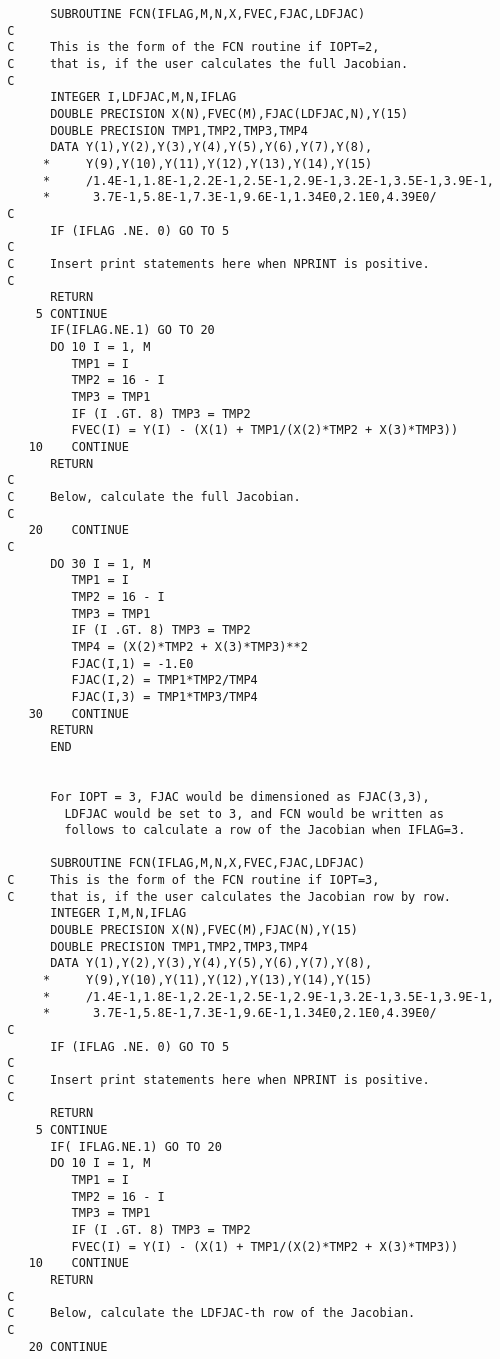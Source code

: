 \begin{verbatim}
       SUBROUTINE FCN(IFLAG,M,N,X,FVEC,FJAC,LDFJAC)
 C
 C     This is the form of the FCN routine if IOPT=2,
 C     that is, if the user calculates the full Jacobian.
 C
       INTEGER I,LDFJAC,M,N,IFLAG
       DOUBLE PRECISION X(N),FVEC(M),FJAC(LDFJAC,N),Y(15)
       DOUBLE PRECISION TMP1,TMP2,TMP3,TMP4
       DATA Y(1),Y(2),Y(3),Y(4),Y(5),Y(6),Y(7),Y(8),
      *     Y(9),Y(10),Y(11),Y(12),Y(13),Y(14),Y(15)
      *     /1.4E-1,1.8E-1,2.2E-1,2.5E-1,2.9E-1,3.2E-1,3.5E-1,3.9E-1,
      *      3.7E-1,5.8E-1,7.3E-1,9.6E-1,1.34E0,2.1E0,4.39E0/
 C
       IF (IFLAG .NE. 0) GO TO 5
 C
 C     Insert print statements here when NPRINT is positive.
 C
       RETURN
     5 CONTINUE
       IF(IFLAG.NE.1) GO TO 20
       DO 10 I = 1, M
          TMP1 = I
          TMP2 = 16 - I
          TMP3 = TMP1
          IF (I .GT. 8) TMP3 = TMP2
          FVEC(I) = Y(I) - (X(1) + TMP1/(X(2)*TMP2 + X(3)*TMP3))
    10    CONTINUE
       RETURN
 C
 C     Below, calculate the full Jacobian.
 C
    20    CONTINUE
 C
       DO 30 I = 1, M
          TMP1 = I
          TMP2 = 16 - I
          TMP3 = TMP1
          IF (I .GT. 8) TMP3 = TMP2
          TMP4 = (X(2)*TMP2 + X(3)*TMP3)**2
          FJAC(I,1) = -1.E0
          FJAC(I,2) = TMP1*TMP2/TMP4
          FJAC(I,3) = TMP1*TMP3/TMP4
    30    CONTINUE
       RETURN
       END


       For IOPT = 3, FJAC would be dimensioned as FJAC(3,3),
         LDFJAC would be set to 3, and FCN would be written as
         follows to calculate a row of the Jacobian when IFLAG=3.

       SUBROUTINE FCN(IFLAG,M,N,X,FVEC,FJAC,LDFJAC)
 C     This is the form of the FCN routine if IOPT=3,
 C     that is, if the user calculates the Jacobian row by row.
       INTEGER I,M,N,IFLAG
       DOUBLE PRECISION X(N),FVEC(M),FJAC(N),Y(15)
       DOUBLE PRECISION TMP1,TMP2,TMP3,TMP4
       DATA Y(1),Y(2),Y(3),Y(4),Y(5),Y(6),Y(7),Y(8),
      *     Y(9),Y(10),Y(11),Y(12),Y(13),Y(14),Y(15)
      *     /1.4E-1,1.8E-1,2.2E-1,2.5E-1,2.9E-1,3.2E-1,3.5E-1,3.9E-1,
      *      3.7E-1,5.8E-1,7.3E-1,9.6E-1,1.34E0,2.1E0,4.39E0/
 C
       IF (IFLAG .NE. 0) GO TO 5
 C
 C     Insert print statements here when NPRINT is positive.
 C
       RETURN
     5 CONTINUE
       IF( IFLAG.NE.1) GO TO 20
       DO 10 I = 1, M
          TMP1 = I
          TMP2 = 16 - I
          TMP3 = TMP1
          IF (I .GT. 8) TMP3 = TMP2
          FVEC(I) = Y(I) - (X(1) + TMP1/(X(2)*TMP2 + X(3)*TMP3))
    10    CONTINUE
       RETURN
 C
 C     Below, calculate the LDFJAC-th row of the Jacobian.
 C
    20 CONTINUE


\end{verbatim}
